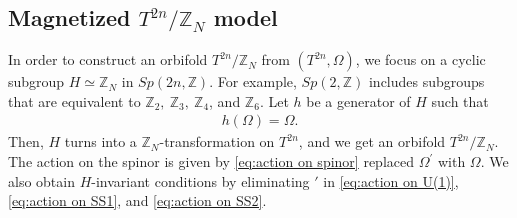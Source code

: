 \documentclass[11pt]{article}
\begin{document}

\subsection{Magnetized $T^{2n}/ \mathbb{Z}_N$ model}

In order to construct an orbifold $T^{2n}/\mathbb{Z}_N$ from $(T^{2n},\Omega)$, we focus on a cyclic subgroup $H\simeq \mathbb{Z}_N$ in $Sp(2n,\mathbb{Z})$. For example, $Sp(2,\mathbb{Z})$ includes subgroups that are equivalent to $\mathbb{Z}_2,~\mathbb{Z}_3,~\mathbb{Z}_4$, and $\mathbb{Z}_6$. Let $h$ be a generator of $H$ such that
\begin{align}
    h(\Omega)=\Omega.
\end{align}
Then, $H$ turns into a $\mathbb{Z}_N$-transformation on $T^{2n}$, and we get an orbifold $T^{2n}/\mathbb{Z}_N$. The action on the spinor is given by \eqref{eq:action on spinor} replaced ${\Omega^\prime}$ with ${\Omega}$. We also obtain $H$-invariant conditions by eliminating $\prime$ in \eqref{eq:action on U(1)}, \eqref{eq:action on SS1}, and \eqref{eq:action on SS2}.
\end{document}
